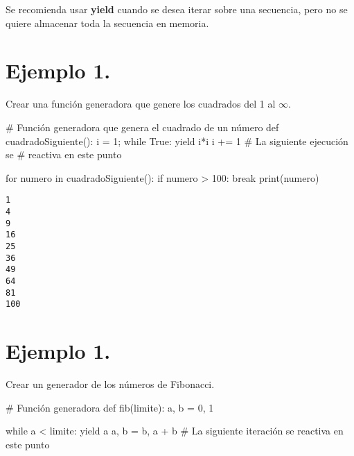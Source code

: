 \documentclass[
  letterpaper,
  DIV=11,
  numbers=noendperiod]{scrreprt}
\newenvironment{Shaded}{\begin{snugshade}}{\end{snugshade}}
\newcommand{\BuiltInTok}[1]{\textcolor[rgb]{0.00,0.23,0.31}{#1}}
\newcommand{\CommentTok}[1]{\textcolor[rgb]{0.37,0.37,0.37}{#1}}
\newcommand{\ControlFlowTok}[1]{\textcolor[rgb]{0.00,0.23,0.31}{#1}}
\newcommand{\DecValTok}[1]{\textcolor[rgb]{0.68,0.00,0.00}{#1}}
\newcommand{\KeywordTok}[1]{\textcolor[rgb]{0.00,0.23,0.31}{#1}}
\newcommand{\NormalTok}[1]{\textcolor[rgb]{0.00,0.23,0.31}{#1}}
\newcommand{\OperatorTok}[1]{\textcolor[rgb]{0.37,0.37,0.37}{#1}}
\newcommand{\VariableTok}[1]{\textcolor[rgb]{0.07,0.07,0.07}{#1}}
\begin{document}
Se recomienda usar \textbf{yield} cuando se desea iterar sobre una
secuencia, pero no se quiere almacenar toda la secuencia en memoria.

\section{\texorpdfstring{\textbf{Ejemplo
1.}}{Ejemplo 1.}}\label{ejemplo-1.-5}

Crear una función generadora que genere los cuadrados del 1 al
\(\infty\).

\begin{Shaded}
\begin{Highlighting}[]
\CommentTok{\# Función generadora que genera el cuadrado de un número}
\KeywordTok{def}\NormalTok{ cuadradoSiguiente():}
\NormalTok{    i }\OperatorTok{=} \DecValTok{1}\OperatorTok{;} 
    \ControlFlowTok{while} \VariableTok{True}\NormalTok{:}
        \ControlFlowTok{yield}\NormalTok{ i}\OperatorTok{*}\NormalTok{i                }
\NormalTok{        i }\OperatorTok{+=} \DecValTok{1}  \CommentTok{\# La siguiente ejecución se }
                \CommentTok{\# reactiva en este punto   }

\ControlFlowTok{for}\NormalTok{ numero }\KeywordTok{in}\NormalTok{ cuadradoSiguiente():}
    \ControlFlowTok{if}\NormalTok{ numero }\OperatorTok{\textgreater{}} \DecValTok{100}\NormalTok{:}
         \ControlFlowTok{break}   
    \BuiltInTok{print}\NormalTok{(numero)}
\end{Highlighting}
\end{Shaded}

\begin{verbatim}
1
4
9
16
25
36
49
64
81
100
\end{verbatim}

\section{\texorpdfstring{\textbf{Ejemplo
1.}}{Ejemplo 1.}}\label{ejemplo-1.-6}

Crear un generador de los números de Fibonacci.

\begin{Shaded}
\begin{Highlighting}[]
\CommentTok{\# Función generadora}
\KeywordTok{def}\NormalTok{ fib(limite):}
\NormalTok{    a, b }\OperatorTok{=} \DecValTok{0}\NormalTok{, }\DecValTok{1}

    \ControlFlowTok{while}\NormalTok{ a }\OperatorTok{\textless{}}\NormalTok{ limite:}
        \ControlFlowTok{yield}\NormalTok{ a }
\NormalTok{        a, b }\OperatorTok{=}\NormalTok{ b, a }\OperatorTok{+}\NormalTok{ b }\CommentTok{\# La siguiente iteración se reactiva en este punto}
\end{Highlighting}
\end{Shaded}
\end{document}
